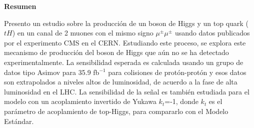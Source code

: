 
\thispagestyle{empty}
 \vspace*{2.2cm}
\begin{center}
\Large \textbf{Resumen}
\end{center} 
\vspace{1.5cm}

\begin{center}
	\justifying
Presento un estudio sobre la producci\'on de un boson de Higgs y un top quark ($tH$) en un canal de 2 muones con el mismo signo $\mu^\pm \mu^\pm$ usando datos publicados por el experimento CMS en el CERN. Estudiando este proceso, se explora este mecanismo de producci\'on del boson de Higgs que a\'un no se ha detectado experimentalmente. La sensibilidad esperada es calculada usando un grupo de datos tipo Asimov para 35.9 fb$^{-1}$ para colisiones de prot\'on-prot\'on y esos datos son extrapolados a niveles altos de luminosidad, de acuerdo a la fase de alta luminosidad en el LHC. La sensibilidad de la se\~nal es tambi\'en estudiada para el modelo con un acoplamiento invertido de Yukawa $k_t$=-1, donde $k_t$ es el par\'ametro de acoplamiento de top-Higgs, para compararlo con el Modelo Est\'andar.
\end{center}
